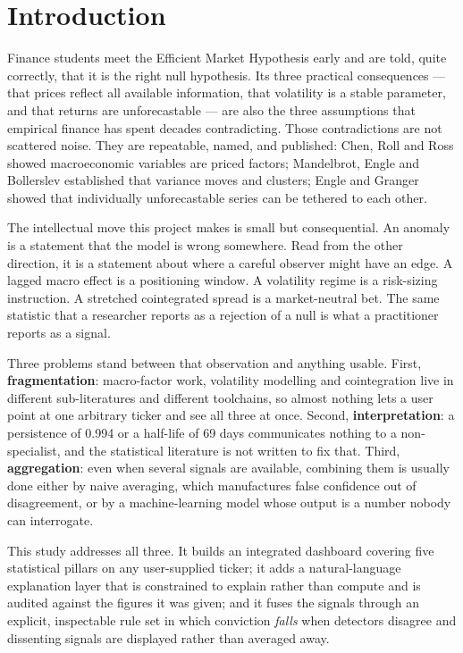 \documentclass[11pt,a4paper]{article}
\begin{document}
\section{Introduction}

Finance students meet the Efficient Market Hypothesis early and are told, quite
correctly, that it is the right null hypothesis. Its three practical consequences ---
that prices reflect all available information, that volatility is a stable parameter, and
that returns are unforecastable --- are also the three assumptions that empirical finance
has spent decades contradicting. Those contradictions are not scattered noise. They are
repeatable, named, and published: Chen, Roll and Ross showed macroeconomic variables are
priced factors; Mandelbrot, Engle and Bollerslev established that variance moves and
clusters; Engle and Granger showed that individually unforecastable series can be
tethered to each other.

The intellectual move this project makes is small but consequential. An anomaly is a
statement that the model is wrong somewhere. Read from the other direction, it is a
statement about where a careful observer might have an edge. A lagged macro effect is a
positioning window. A volatility regime is a risk-sizing instruction. A stretched
cointegrated spread is a market-neutral bet. The same statistic that a researcher reports
as a rejection of a null is what a practitioner reports as a signal.

Three problems stand between that observation and anything usable. First,
\textbf{fragmentation}: macro-factor work, volatility modelling and cointegration live in
different sub-literatures and different toolchains, so almost nothing lets a user point at
one arbitrary ticker and see all three at once. Second, \textbf{interpretation}: a
persistence of 0.994 or a half-life of 69 days communicates nothing to a non-specialist,
and the statistical literature is not written to fix that. Third,
\textbf{aggregation}: even when several signals are available, combining them is usually
done either by naive averaging, which manufactures false confidence out of disagreement,
or by a machine-learning model whose output is a number nobody can interrogate.

This study addresses all three. It builds an integrated dashboard covering five
statistical pillars on any user-supplied ticker; it adds a natural-language explanation
layer that is constrained to explain rather than compute and is audited against the
figures it was given; and it fuses the signals through an explicit, inspectable rule set
in which conviction \emph{falls} when detectors disagree and dissenting signals are
displayed rather than averaged away.
\end{document}
